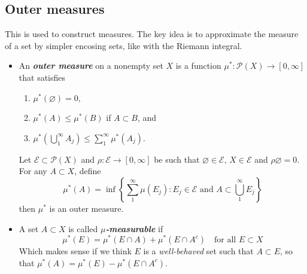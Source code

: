 \documentclass{article}
\theoremstyle{definition}
\numberwithin{equation}{section}
\begin{document}
	\subsection{Outer measures}
	This is used to construct measures. The key idea is to approximate the measure of a set by simpler encosing sets, like with the Riemann integral.
	\begin{itemize}
		\item An \textbf{\textit{outer measure}} on a nonempty set $X$ is a function $\mu^*:\mathcal{P}(X)\to[0,\infty]$ that satisfies
		\begin{enumerate}
			\item $\mu^*(\varnothing)=0$,
			\item $\mu^*(A)\leq\mu^*(B)$ if $A\subset B$, and
			\item $\mu^*\left(\bigcup_{1}^\infty A_j\right)\leq\sum_1^\infty\mu^*(A_j)$.
		\end{enumerate}
		
		\begin{prop}
			Let $\mathcal{E}\subset\mathcal{P}(X)$ and $\rho:\mathcal{E}\to[0,\infty]$ be such that $\varnothing\in\mathcal{E}$, $X\in\mathcal{E}$ and $\rho{\varnothing}=0$. For any $A\subset X$, define
			\begin{equation}\label{eq:outer-measure}
				\mu^*(A)=\inf\left\{\sum_1^\infty\mu(E_j):E_j\in\mathcal{E}\text{ and }A\subset\bigcup_1^\infty E_j\right\}
			\end{equation}
			then $\mu^*$ is an outer measure.
		\end{prop}
		\item A set $A\subset X$ is called \textbf{\textit{$\mu$-measurable}} if
		\[\mu^*(E)=\mu^*(E\cap A)+\mu^*(E\cap A^c)\quad\text{for all } E\subset X\]
		Which makes sense if we think $E$ is a \textit{well-behaved} set such that $A\subset E$, so that $\mu^*(A)=\mu^*(E)-\mu^*(E\cap A^c)$.
		

\end{itemize}
\end{document}
